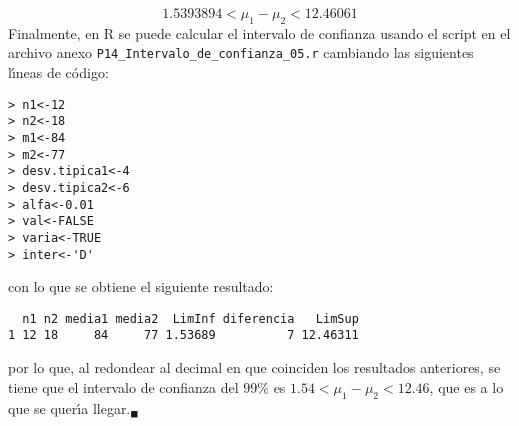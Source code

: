 \begin{solucion}
 \begin{equation*}
  1.5393894 < \mu_1 - \mu_2 < 12.46061
 \end{equation*}
 Finalmente, en R se puede calcular el intervalo de confianza usando el script en el archivo anexo \texttt{P14\_Intervalo\_de\_confianza\_05.r} cambiando las siguientes l\'{\i}neas de c\'odigo:
 \begin{verbatim}
> n1<-12
> n2<-18
> m1<-84
> m2<-77
> desv.tipica1<-4
> desv.tipica2<-6
> alfa<-0.01
> val<-FALSE
> varia<-TRUE
> inter<-'D'  
 \end{verbatim}
 \vspace{-0.5cm}
 con lo que se obtiene el siguiente resultado:
 \begin{verbatim}
  n1 n2 media1 media2  LimInf diferencia   LimSup
1 12 18     84     77 1.53689          7 12.46311
 \end{verbatim}
 \vspace{-0.5cm}
 por lo que, al redondear al decimal en que coinciden los resultados anteriores, se tiene que el intervalo de confianza del $99\%$ es $1.54 < \mu_1 - \mu_2 < 12.46$, que es a lo que se quer\'{\i}a llegar.${}_{\blacksquare}$ 
\end{solucion}
